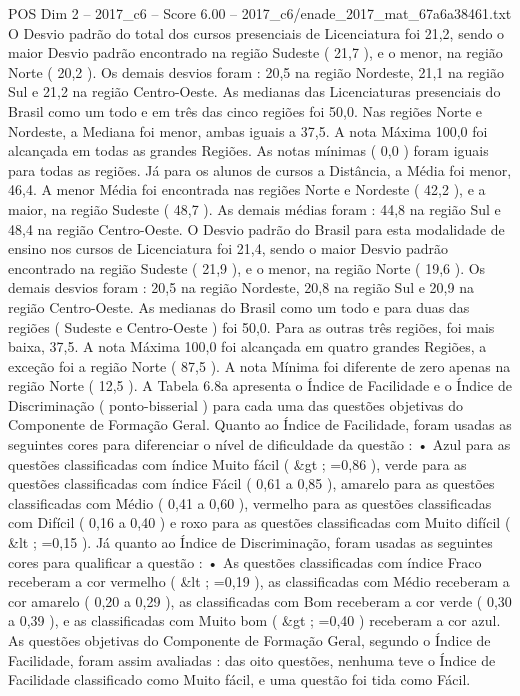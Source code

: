 \begin{textsample}{POS Dim 2 – 2017\_c6 – Score 6.00 – 2017\_c6/enade\_2017\_mat\_67a6a38461.txt}
O Desvio padrão do total dos cursos presenciais de Licenciatura foi 21,2, sendo o maior Desvio padrão encontrado na região Sudeste ( 21,7 ), e o menor, na região Norte ( 20,2 ).
Os demais desvios foram : 20,5 na região Nordeste, 21,1 na região Sul e 21,2 na região Centro-Oeste.
As medianas das Licenciaturas presenciais do Brasil como um todo e em três das cinco regiões foi 50,0.
Nas regiões Norte e Nordeste, a Mediana foi menor, ambas iguais a 37,5.
A nota Máxima 100,0 foi alcançada em todas as grandes Regiões.
As notas mínimas ( 0,0 ) foram iguais para todas as regiões.
Já para os alunos de cursos a Distância, a Média foi menor, 46,4.
A menor Média foi encontrada nas regiões Norte e Nordeste ( 42,2 ), e a maior, na região Sudeste ( 48,7 ).
As demais médias foram : 44,8 na região Sul e 48,4 na região Centro-Oeste.
O Desvio padrão do Brasil para esta modalidade de ensino nos cursos de Licenciatura foi 21,4, sendo o maior Desvio padrão encontrado na região Sudeste ( 21,9 ), e o menor, na região Norte ( 19,6 ).
Os demais desvios foram : 20,5 na região Nordeste, 20,8 na região Sul e 20,9 na região Centro-Oeste.
As medianas do Brasil como um todo e para duas das regiões ( Sudeste e Centro-Oeste ) foi 50,0.
Para as outras três regiões, foi mais baixa, 37,5.
A nota Máxima 100,0 foi alcançada em quatro grandes Regiões, a exceção foi a região Norte ( 87,5 ).
A nota Mínima foi diferente de zero apenas na região Norte ( 12,5 ).
A Tabela 6.8a apresenta o Índice de Facilidade e o Índice de Discriminação ( ponto-bisserial ) para cada uma das questões objetivas do Componente de Formação Geral.
Quanto ao Índice de Facilidade, foram usadas as seguintes cores para diferenciar o nível de dificuldade da questão : • Azul para as questões classificadas com índice Muito fácil ( \&gt ; =0,86 ), verde para as questões classificadas com índice Fácil ( 0,61 a 0,85 ), amarelo para as questões classificadas com Médio ( 0,41 a 0,60 ), vermelho para as questões classificadas com Difícil ( 0,16 a 0,40 ) e roxo para as questões classificadas com Muito difícil ( \&lt ; =0,15 ).
Já quanto ao Índice de Discriminação, foram usadas as seguintes cores para qualificar a questão : • As questões classificadas com índice Fraco receberam a cor vermelho ( \&lt ; =0,19 ), as classificadas com Médio receberam a cor amarelo ( 0,20 a 0,29 ), as classificadas com Bom receberam a cor verde ( 0,30 a 0,39 ), e as classificadas com Muito bom ( \&gt ; =0,40 ) receberam a cor azul.
As questões objetivas do Componente de Formação Geral, segundo o Índice de Facilidade, foram assim avaliadas : das oito questões, nenhuma teve o Índice de Facilidade classificado como Muito fácil, e uma questão foi tida como Fácil.

\end{textsample}
